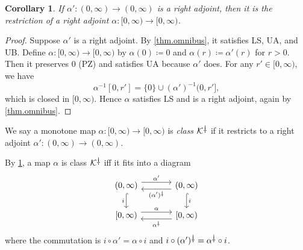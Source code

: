\documentclass[11pt, one side, article]{memoir}
\theoremstyle{definition}
\theoremstyle{plain}
\newtheorem{corollary}[definitionx]{Corollary}
\newenvironment{definition}
  {\pushQED{\qed}\renewcommand{\qedsymbol}{$\lozenge$}\definitionx}
  {\popQED\enddefinitionx}
\newcommand{\cat}[1]{\mathcal{#1}}%
\newcommand{\ldag}{^{\rotatebox{180}{$\dagger$}}}
\newcommand{\inv}{^{-1}}
\newcommand{\K}{\cat{K}}
\newcommand{\Kdag}[1][0]{\K\ldag}
\begin{document}


\begin{corollary}\label{cor.restrict_adjoint}
If $\alpha'\colon(0,\infty)\to (0,\infty)$ is a right adjoint, then it is the restriction of a right adjoint $\alpha\colon[0,\infty)\to [0,\infty)$.
\end{corollary}
\begin{proof}
Suppose $\alpha'$ is a right adjoint. By \cref{thm.omnibus}, it satisfies LS, UA, and UB. Define $\alpha\colon[0,\infty)\to [0,\infty)$ by $\alpha(0)\coloneqq 0$ and $\alpha(r)\coloneqq\alpha'(r)$ for $r>0$. Then it preserves 0 (PZ) and satisfies UA because $\alpha'$ does. For any $r'\in[0,\infty)$, we have
\[\alpha\inv[0,r']=\{0\}\cup(\alpha')\inv(0,r'],\]
which is closed in $[0,\infty)$. Hence $\alpha$ satisfies LS and is a right adjoint, again by \cref{thm.omnibus}.
\end{proof}

\begin{definition}
We say a monotone map $\alpha\colon[0,\infty)\to [0,\infty)$ is \emph{class $\Kdag$} if it restricts to a right adjoint $\alpha'\colon(0,\infty)\to(0,\infty)$.
\end{definition}

By \cref{cor.restrict_adjoint}, a map $\alpha$ is class $\Kdag$ iff it fits into a diagram
\[
\begin{tikzcd}[column sep=large]
	{(0,\infty)}\ar[r, shift left=4pt, "\alpha'"]\ar[d, hook, "i"']&
	{(0,\infty)}\ar[l, shift left=4pt, "{(\alpha')\ldag}"]\ar[d, hook, "i"]\\
	{[0,\infty)}\ar[r, shift left=4pt, "\alpha"]&
	{[0,\infty)}\ar[l, shift left=4pt, "\alpha\ldag"]
\end{tikzcd}
\]
where the commutation is $i\circ\alpha'=\alpha\circ i$ and $i\circ(\alpha')\ldag=\alpha\ldag\circ i$.
\end{document}
